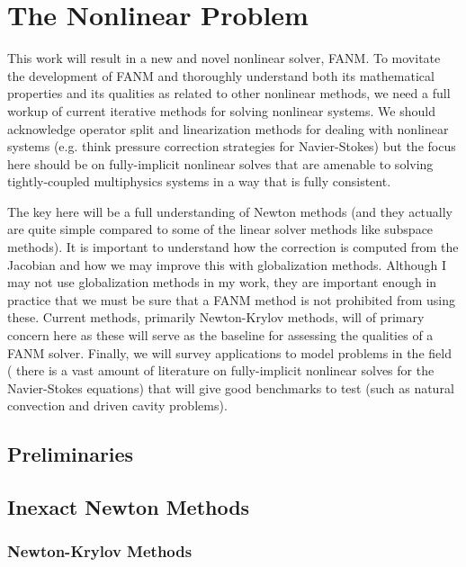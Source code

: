 \chapter{The Nonlinear Problem}
\label{ch:nonlinear_problem}

This work will result in a new and novel nonlinear solver, FANM. To
movitate the development of FANM and thoroughly understand both its
mathematical properties and its qualities as related to other
nonlinear methods, we need a full workup of current iterative methods
for solving nonlinear systems. We should acknowledge operator split
and linearization methods for dealing with nonlinear systems
(e.g. think pressure correction strategies for Navier-Stokes) but the
focus here should be on fully-implicit nonlinear solves that are
amenable to solving tightly-coupled multiphysics systems in a way that
is fully consistent.

The key here will be a full understanding of Newton methods (and they
actually are quite simple compared to some of the linear solver
methods like subspace methods). It is important to understand how the
correction is computed from the Jacobian and how we may improve this
with globalization methods. Although I may not use globalization
methods in my work, they are important enough in practice that we must
be sure that a FANM method is not prohibited from using these. Current
methods, primarily Newton-Krylov methods, will of primary concern here
as these will serve as the baseline for assessing the qualities of a
FANM solver. Finally, we will survey applications to model problems in
the field ( there is a vast amount of literature on fully-implicit
nonlinear solves for the Navier-Stokes equations) that will give good
benchmarks to test (such as natural convection and driven cavity
problems).

\section{Preliminaries}
\label{sec:nonlinear_preliminaries}

\section{Inexact Newton Methods}
\label{sec:newton_methods}

\subsection{Newton-Krylov Methods}
\label{subsec:newton_krylov_methods}

